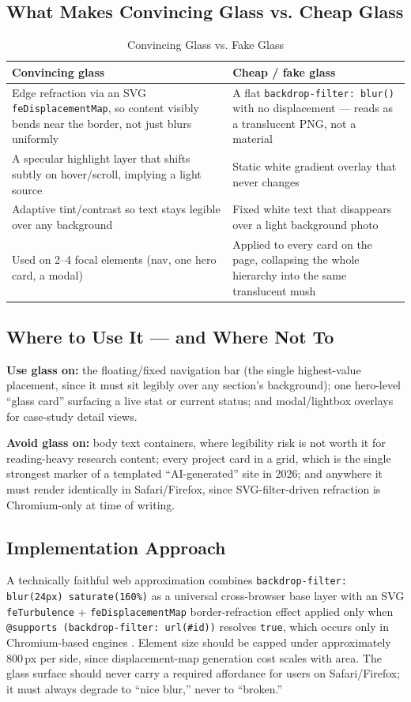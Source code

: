 \documentclass[conference]{IEEEtran}
\begin{document}
\subsection{What Makes Convincing Glass vs. Cheap Glass}
\begin{table}[h]
\centering
\caption{Convincing Glass vs. Fake Glass}
\label{tab:glass_full}
\begin{tabular}{L{4.0cm}L{4.0cm}}
\toprule
\textbf{Convincing glass} & \textbf{Cheap / fake glass} \\
\midrule
Edge refraction via an SVG \texttt{feDisplacementMap}, so content visibly bends near the border, not just blurs uniformly & A flat \texttt{backdrop-filter: blur()} with no displacement --- reads as a translucent PNG, not a material \\
A specular highlight layer that shifts subtly on hover/scroll, implying a light source & Static white gradient overlay that never changes \\
Adaptive tint/contrast so text stays legible over any background & Fixed white text that disappears over a light background photo \\
Used on 2--4 focal elements (nav, one hero card, a modal) & Applied to every card on the page, collapsing the whole hierarchy into the same translucent mush \\
\bottomrule
\end{tabular}
\end{table}

\subsection{Where to Use It --- and Where Not To}
\textbf{Use glass on:} the floating/fixed navigation bar (the single highest-value placement, since it must sit legibly over any section's background); one hero-level ``glass card'' surfacing a live stat or current status; and modal/lightbox overlays for case-study detail views.

\textbf{Avoid glass on:} body text containers, where legibility risk is not worth it for reading-heavy research content; every project card in a grid, which is the single strongest marker of a templated ``AI-generated'' site in 2026; and anywhere it must render identically in Safari/Firefox, since SVG-filter-driven refraction is Chromium-only at time of writing.

\subsection{Implementation Approach}
A technically faithful web approximation combines \texttt{backdrop-filter: blur(24px) saturate(160\%)} as a universal cross-browser base layer with an SVG \texttt{feTurbulence} + \texttt{feDisplacementMap} border-refraction effect applied only when \texttt{@supports (backdrop-filter: url(\#id))} resolves \texttt{true}, which occurs only in Chromium-based engines \cite{ekino_glass, logrocket_svgglass}. Element size should be capped under approximately 800\,px per side, since displacement-map generation cost scales with area. The glass surface should never carry a required affordance for users on Safari/Firefox; it must always degrade to ``nice blur,'' never to ``broken.''
\end{document}
